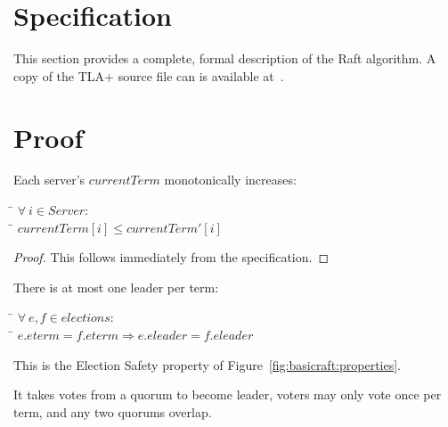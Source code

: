 \section{Specification}

This section provides a complete, formal description of the Raft
algorithm.
A copy of the TLA+ source file can is available at~\cite{raft.tla}.



\renewcommand\A{\forall\ }
\renewcommand\E{\exists\ }
\renewcommand\implies{\Rightarrow}

\section{Proof}

\begin{lemma} %
\label{appendix:correctness:currenttermmonotonic}
Each server's $currentTerm$ monotonically increases:
\begin{tabbing}
\tab\=\+
$\A i \in Server : $ \\
\tab\=\+
$currentTerm[i] \leq currentTerm'[i]$
\end{tabbing}
\end{lemma}

\begin{proof}
This follows immediately from the specification.
\end{proof}

\begin{lemma} %
\label{appendix:correctness:olpt}
There is at most one leader per term:
\begin{tabbing}
\tab\=\+
$\A e,f \in elections : $ \\
\tab\=\+
$e.eterm = f.eterm \implies e.eleader = f.eleader$
\end{tabbing}
This is the Election Safety property of
Figure~\ref{fig:basicraft:properties}.
\end{lemma}

\begin{sketch}
It takes votes from a quorum to become leader, voters may only vote
once per term, and any two quorums overlap.
\end{sketch}

